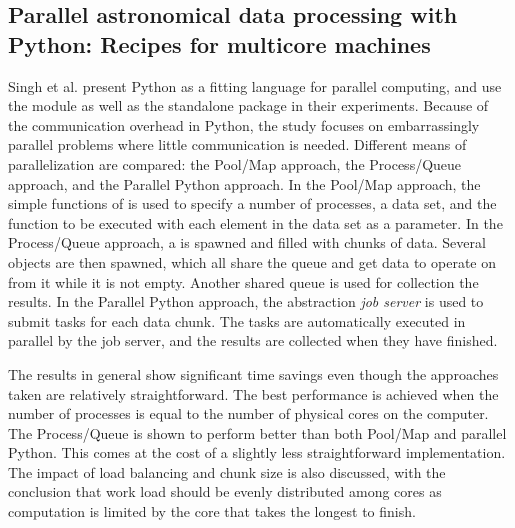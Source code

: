 \subsection{Parallel astronomical data processing with Python: Recipes for multicore machines}
Singh et al. \cite{singh_2013_parallel_padpwprfmm} present Python as a fitting language for parallel computing, and use the
 module as well as the standalone  package in their experiments. Because of the
communication overhead in Python, the study focuses on embarrassingly parallel problems where little communication is needed.
Different means of parallelization are
compared: the Pool/Map approach, the Process/Queue approach, and the Parallel Python approach. %
In the Pool/Map approach, the simple functions of  is used to specify a number of processes, a data
set, and the function to be executed with each element in the data set as a parameter. In the Process/Queue approach, a
 is spawned and filled with chunks of data. Several  objects are then
spawned, which all share the queue and get data to operate on from it while it is not empty. Another shared queue is used for
collection the results. In the Parallel Python approach, the  abstraction \emph{job server}
is used to submit tasks for each data chunk. The tasks are automatically executed in parallel by the job server, and the results
are collected when they have finished.

The results in general show significant time savings even though the approaches taken are relatively straightforward.
The best performance is achieved when the number of processes is equal to the number of physical cores on the computer.
The Process/Queue is shown to perform better than both Pool/Map and parallel Python. This comes at the cost of a slightly less
straightforward implementation. The impact of load balancing and chunk size is also discussed, with the conclusion that work load
should be evenly distributed among cores as computation is limited by the core that takes the longest to finish.

